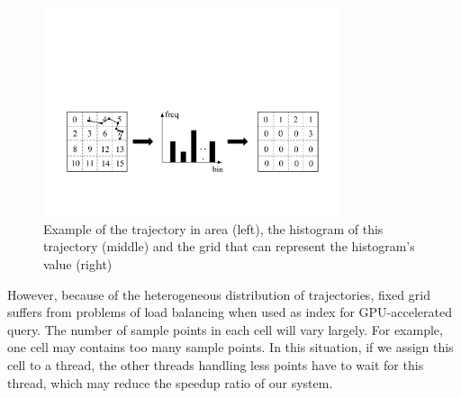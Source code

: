 \documentclass[conference]{IEEEtran}
\begin{document}
\begin{figure}[htbp]
	\centering
	\includegraphics[width=8.7cm]{pdf/Histo.pdf}
	\caption{Example of the trajectory in area (left), the histogram of this trajectory (middle) and the grid that can represent the histogram's value (right)}
	\label{FreqGrid}
\end{figure}

However, because of the heterogeneous distribution of trajectories, fixed grid suffers from problems of load balancing when used as index for GPU-accelerated query. The number of sample points in each cell will vary largely. For example, one cell may contains too many sample points. In this situation, if we assign this cell to a thread, the other threads handling less points have to wait for this thread, which may reduce the speedup ratio of our system.
\end{document}
